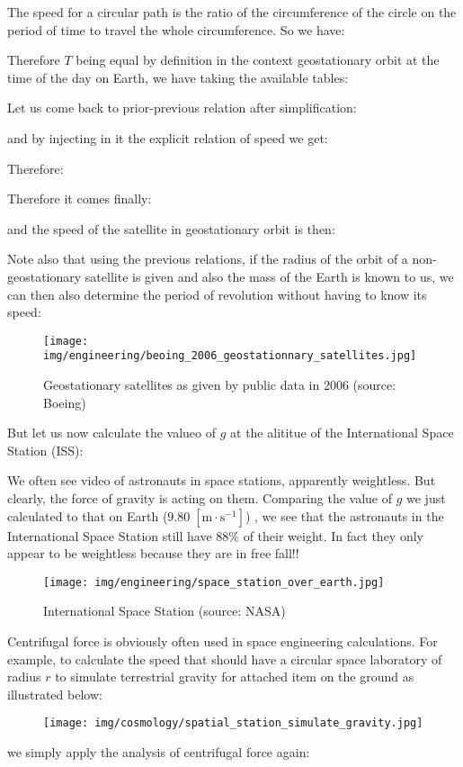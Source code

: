 	The speed for a circular path is the ratio of the circumference of the circle on the period of time to travel the whole circumference. So we have:
	
	Therefore $T$ being equal by definition in the context geostationary orbit at the time of the day on Earth, we have taking the available tables:
	
	Let us come back to prior-previous relation after simplification:
	
	and by injecting in it the explicit relation of speed we get:
	
	Therefore:
	
	Therefore it comes finally:
	
	and the speed of the satellite in geostationary orbit is then:
	
	Note also that using the previous relations, if the radius of the orbit of a non-geostationary satellite is given and also the mass of the Earth is known to us, we can then also determine the period of revolution without having to know its speed:
	
	\begin{figure}[H]
		\centering
		\texttt{[image: img/engineering/beoing\_2006\_geostationnary\_satellites.jpg]}
		\caption[Geostationary satellites as given by public data in 2006]{Geostationary satellites as given by public data in 2006 (source: Boeing)}
	\end{figure}
	But let us now calculate the valueo of $g$ at the alititue of the International Space Station (ISS):
	
	We often see video of astronauts in space stations, apparently weightless. But clearly, the force of gravity is acting
on them. Comparing the value of $g$ we just calculated to that on Earth ($9.80\;[\text{m}\cdot \text{s}^{-1}]$) , we see that the astronauts in the International Space Station still have $88\%$ of their weight. In fact they only appear to be weightless because they are in free fall!!
	\begin{figure}[H]
		\centering
		\texttt{[image: img/engineering/space\_station\_over\_earth.jpg]}
		\caption[International Space Station]{International Space Station (source: NASA)}
	\end{figure}
	Centrifugal force is obviously often used in space engineering calculations. For example, to calculate the speed that should have a circular space laboratory of radius $r$ to simulate terrestrial gravity for attached item on the ground as illustrated below:
	\begin{figure}[H]
		\centering
		\texttt{[image: img/cosmology/spatial\_station\_simulate\_gravity.jpg]}
	\end{figure}
	we simply apply the analysis of centrifugal force again:
	
